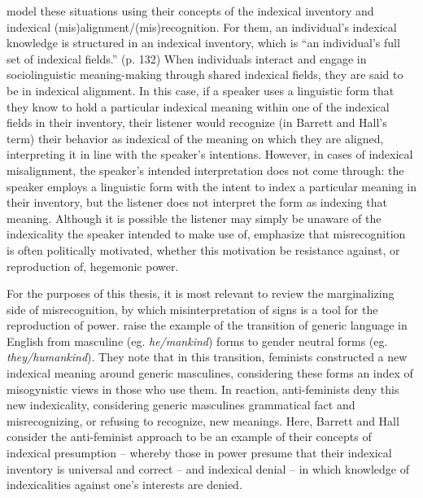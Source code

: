 \documentclass[12pt,twoside]{reedthesis}
\begin{document}
\textcite{barrett_sexuality_2024} model these situations using their concepts of the indexical inventory and indexical (mis)alignment/(mis)recognition. For them, an individual's indexical knowledge is structured in an indexical inventory, which is ``an individual's full set of indexical fields.'' (p. 132) When individuals interact and engage in sociolinguistic meaning-making through shared indexical fields, they are said to be in indexical alignment. In this case, if a speaker uses a linguistic form that they know to hold a particular indexical meaning within one of the indexical fields in their inventory, their listener would recognize (in Barrett and Hall's term) their behavior as indexical of the meaning on which they are aligned, interpreting it in line with the speaker's intentions. However, in cases of indexical misalignment, the speaker's intended interpretation does not come through: the speaker employs a linguistic form with the intent to index a particular meaning in their inventory, but the listener does not interpret the form as indexing that meaning. Although it is possible the listener may simply be unaware of the indexicality the speaker intended to make use of, \textcite{barrett_sexuality_2024} emphasize that misrecognition is often politically motivated, whether this motivation be resistance against, or reproduction of, hegemonic power.

For the purposes of this thesis, it is most relevant to review the marginalizing side of misrecognition, by which misinterpretation of signs is a tool for the reproduction of power. \textcite{barrett_sexuality_2024} raise the example of the transition of generic language in English from masculine (eg. \textit{he/mankind}) forms to gender neutral forms (eg. \textit{they/humankind}). They note that in this transition, feminists constructed a new indexical meaning around generic masculines, considering these forms an index of misogynistic views in those who use them. In reaction, anti-feminists deny this new indexicality, considering generic masculines grammatical fact and misrecognizing, or refusing to recognize, new meanings. Here, Barrett and Hall consider the anti-feminist approach to be an example of their concepts of indexical presumption -- whereby those in power presume that their indexical inventory is universal and correct -- and indexical denial -- in which knowledge of indexicalities against one's interests are denied.
\end{document}
